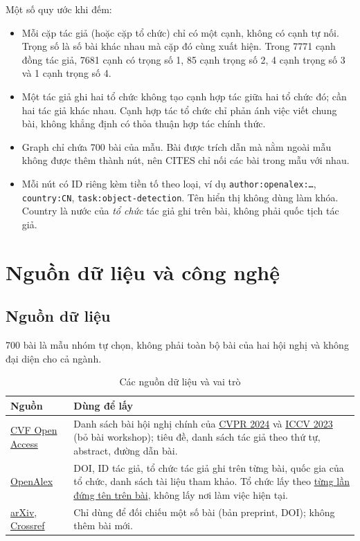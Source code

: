 \documentclass[11pt,a4paper]{article}
\begin{document}
Một số quy ước khi đếm:
\begin{itemize}[leftmargin=1.4em]
  \item Mỗi cặp tác giả (hoặc cặp tổ chức) chỉ có một cạnh, không có cạnh tự nối. Trọng số là số bài khác nhau mà cặp đó cùng xuất hiện. Trong 7771 cạnh đồng tác giả, 7681 cạnh có trọng số 1, 85 cạnh trọng số 2, 4 cạnh trọng số 3 và 1 cạnh trọng số 4.
  \item Một tác giả ghi hai tổ chức không tạo cạnh hợp tác giữa hai tổ chức đó; cần hai tác giả khác nhau. Cạnh hợp tác tổ chức chỉ phản ánh việc viết chung bài, không khẳng định có thỏa thuận hợp tác chính thức.
  \item Graph chỉ chứa 700 bài của mẫu. Bài được trích dẫn mà nằm ngoài mẫu không được thêm thành nút, nên CITES chỉ nối các bài trong mẫu với nhau.
  \item Mỗi nút có ID riêng kèm tiền tố theo loại, ví dụ \texttt{author:openalex:\ldots}, \texttt{country:CN}, \texttt{task:object-detection}. Tên hiển thị không dùng làm khóa. Country là nước của \emph{tổ chức} tác giả ghi trên bài, không phải quốc tịch tác giả.
\end{itemize}


\section{Nguồn dữ liệu và công nghệ}

\subsection{Nguồn dữ liệu}\label{sec:nguon}

700 bài là mẫu nhóm tự chọn, không phải toàn bộ bài của hai hội nghị và không đại diện cho cả ngành.

\begin{table}[H]
\small\centering
\renewcommand{\arraystretch}{1.25}
\caption{Các nguồn dữ liệu và vai trò}
\label{tab:nguon}
\begin{tabularx}{\textwidth}{@{}>{\raggedright\arraybackslash}p{3.2cm} >{\raggedright\arraybackslash}X@{}}
\toprule
\textbf{Nguồn} & \textbf{Dùng để lấy}\\
\midrule
\href{https://openaccess.thecvf.com/}{CVF Open Access} & Danh sách bài hội nghị chính của \href{https://openaccess.thecvf.com/CVPR2024}{CVPR 2024} và \href{https://openaccess.thecvf.com/ICCV2023}{ICCV 2023} (bỏ bài workshop); tiêu đề, danh sách tác giả theo thứ tự, abstract, đường dẫn bài.\\
\href{https://help.openalex.org/data/works/}{OpenAlex} & DOI, ID tác giả, tổ chức tác giả ghi trên từng bài, quốc gia của tổ chức, danh sách tài liệu tham khảo. Tổ chức lấy theo \href{https://help.openalex.org/data/authorships/}{từng lần đứng tên trên bài}, không lấy nơi làm việc hiện tại.\\
\href{https://info.arxiv.org/help/versions.html}{arXiv}, \href{https://www.crossref.org/documentation/retrieve-metadata/rest-api/}{Crossref} & Chỉ dùng để đối chiếu một số bài (bản preprint, DOI); không thêm bài mới.\\
\bottomrule
\end{tabularx}
\end{table}
\end{document}
